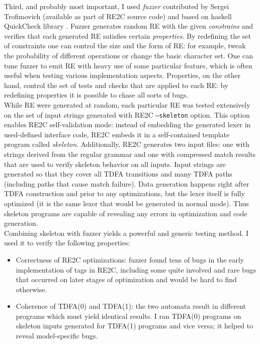 \documentclass{article}
\theoremstyle{definition}
\begin{document}
\begin{multicols}{2}
Third, and probably most important, I used \emph{fuzzer} contributed by Sergei Trofimovich
(available as part of RE2C source code)
and based on haskell QuickCheck library \cite{CH11}.
Fuzzer generates random RE with the given \emph{constrains}
and verifies that each generated RE satisfies certain \emph{properties}.
By redefining the set of constraints one can control the size and the form of RE:
for example, tweak the probability of different operations or change the basic character set.
One can tune fuzzer to emit RE with heavy use of some particular feature,
which is often useful when testing various implementation aspects.
Properties, on the other hand, control the set of tests and checks that are applied to each RE:
by redefining properties it is possible to chase all sorts of bugs.
\\

While RE were generated at random, each particular RE was tested extensively
on the set of input strings generated with RE2C \texttt{--skeleton} option.
This option enables RE2C self-validation mode:
instead of embedding the generated lexer in used-defined interface code,
RE2C embeds it in a self-contained template program called \emph{skeleton}.
Additionally, RE2C generates two input files: one with strings derived from the regular grammar
and one with compressed match results that are used to verify skeleton behavior on all inputs.
Input strings are generated so that they cover all TDFA transitions and many TDFA paths
(including paths that cause match failure).
Data generation happens right after TDFA construction and prior to any optimizations,
but the lexer itself is fully optimized (it is the same lexer that would be generated in normal mode).
Thus skeleton programs are capable of revealing any errors in optimization and code generation.
\\

Combining skeleton with fuzzer yields a powerful and generic testing method.
I used it to verify the following properties:

\begin{itemize}
    \setlength{\parskip}{0.5em}

    \item Correctness of RE2C optimizations:
        fuzzer found tens of bugs in the early implementation of tags in RE2C,
        including some quite involved and rare bugs that occurred on later stages of optimization
        and would be hard to find otherwise.

    \item Coherence of TDFA(0) and TDFA(1):
        the two automata result in different programs which must yield identical results.
        I ran TDFA(0) programs on skeleton inputs generated for TDFA(1) programs and vice versa;
        it helped to reveal model-specific bugs.


\end{itemize}
\end{multicols}
\end{document}
